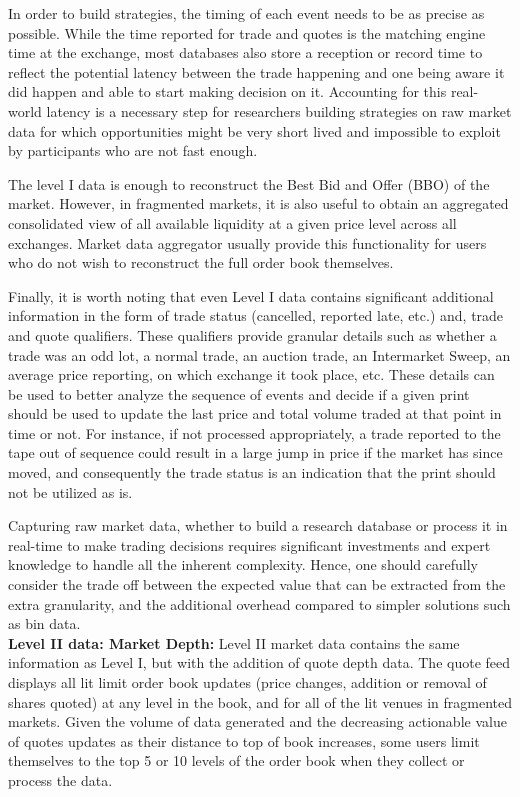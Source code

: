 In order to build strategies, the timing of each event needs to be as precise as possible. While the time reported for trade and quotes is the matching engine time at the exchange, most databases also store a reception or record time to reflect the potential latency between the trade happening and one being aware it did happen and able to start making decision on it. Accounting for this real-world latency is a necessary step for researchers building strategies on raw market data for which opportunities might be very short lived and impossible to exploit by participants who are not fast enough.


The level I data is enough to reconstruct the Best Bid and Offer (BBO) of the market. However, in fragmented markets, it is also useful to obtain an aggregated consolidated view of all available liquidity at a given price level across all exchanges. Market data aggregator usually provide this functionality for users who do not wish to reconstruct the full order book themselves. 


Finally, it is worth noting that even Level I data contains significant additional information in the form of trade status (cancelled, reported late, etc.) and, trade and quote qualifiers. These qualifiers provide granular details such as whether a trade was an odd lot, a normal trade, an auction trade, an Intermarket Sweep, an average price reporting, on which exchange it took place, etc. These details can be used to better analyze the sequence of events and decide if a given print should be used to update the last price and total volume traded at that point in time or not. For instance, if not processed appropriately, a trade reported to the tape out of sequence could result in a large jump in price if the market has since moved, and consequently the trade status is an indication that the print should not be utilized as is.


Capturing raw market data, whether to build a research database or process it in real-time to make trading decisions requires significant investments and expert knowledge to handle all the inherent complexity. Hence, one should carefully consider the trade off between the expected value that can be extracted from the extra granularity, and the additional overhead compared to simpler solutions such as bin data.\\


\noindent\textbf{Level II data: Market Depth:}  Level II market data contains the same information as Level I, but with the addition of quote depth data. The quote feed displays all lit limit order book updates (price changes, addition or removal of shares quoted) at any level in the book, and for all of the lit venues in fragmented markets. Given the volume of data generated and the decreasing actionable value of quotes updates as their distance to top of book increases, some users limit themselves to the top 5 or 10 levels of the order book  when they collect or process the data.\\



